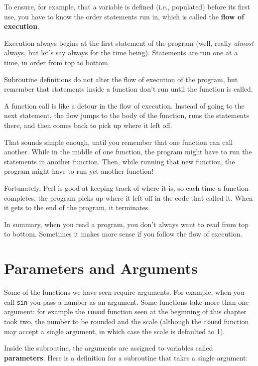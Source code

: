 To ensure, for example, that a variable is defined (i.e., populated) 
before its first use, you have to know the order statements run in, 
which is called the {\bf flow of execution}.

Execution always begins at the first statement of the program 
(well, really \emph{almost} always, but let's say always 
for the time being). Statements are run one at a time, 
in order from top to bottom.

Subroutine definitions do not alter the flow of execution of the
program, but remember that statements inside a function don't
run until the function is called.

A function call is like a detour in the flow of execution. Instead of
going to the next statement, the flow jumps to the body of
the function, runs the statements there, and then comes back
to pick up where it left off.

That sounds simple enough, until you remember that one function can
call another.  While in the middle of one function, the program might
have to run the statements in another function.  Then, while
running that new function, the program might have to run yet
another function!

Fortunately, Perl is good at keeping track of where it is, so each
time a function completes, the program picks up where it left off in
the code that called it.  When it gets to the end of the program,
it terminates.

In summary, when you read a program, you
don't always want to read from top to bottom.  Sometimes it makes
more sense if you follow the flow of execution.


\section{Parameters and Arguments}
\label{parameters}

Some of the functions we have seen require arguments.  For
example, when you call {\tt sin} you pass a number
as an argument.  Some functions take more than one argument:
for example the {\tt round} function seen at the beginning 
of this chapter took two, the number to be rounded and 
the scale (although the {\tt round} function may accept a single argument, in which case the scale is defaulted to 1).

Inside the subroutine, the arguments are assigned to
variables called {\bf parameters}.  Here is a definition for
a subroutine that takes a single argument:

